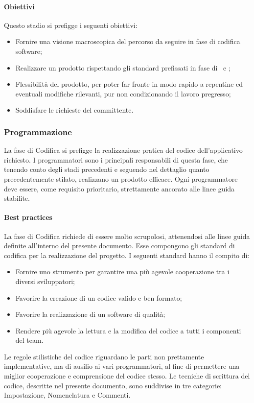		\paragraph{Obiettivi}
		Questo stadio si prefigge i seguenti obiettivi:
		\begin{itemize}
			\item Fornire una visione macroscopica del percorso da seguire in fase di codifica software;
			\item Realizzare un prodotto rispettando gli standard prefissati in fase di \SdF\ e \AdR;
			\item Flessibilità del prodotto, per poter far fronte in modo rapido a repentine ed eventuali modifiche rilevanti, pur non condizionando il lavoro pregresso;
			\item Soddisfare le richieste del committente.
		\end{itemize}
	
	\subsubsection{Programmazione}
	La fase di Codifica si prefigge la realizzazione pratica del codice dell'applicativo richiesto. I programmatori sono i principali responsabili di questa fase, che tenendo conto degli stadi precedenti e seguendo nel dettaglio quanto precedentemente stilato, realizzano un prodotto efficace. Ogni programmatore deve essere, come requisito prioritario, strettamente ancorato alle linee guida stabilite.
	
		\paragraph{Best practices}
		La fase di Codifica richiede di essere molto scrupolosi, attenendosi alle linee guida definite all'interno del presente documento. Esse compongono gli standard di codifica per la realizzazione del progetto. I seguenti standard hanno il compito di:
		\begin{itemize}
			\item Fornire uno strumento per garantire una più agevole cooperazione tra i diversi sviluppatori;
			\item Favorire la creazione di un codice valido e ben formato;
			\item Favorire la realizzazione di un software di qualità;
			\item Rendere più agevole la lettura e la modifica del codice a tutti i componenti del team.
		\end{itemize}
		Le regole stilistiche del codice riguardano le parti non prettamente implementative, ma di ausilio ai vari programmatori, al fine di permettere una miglior cooperazione e comprensione del codice stesso. Le tecniche di scrittura del codice, descritte nel presente documento, sono suddivise in tre categorie: Impostazione, Nomenclatura e Commenti.
	

